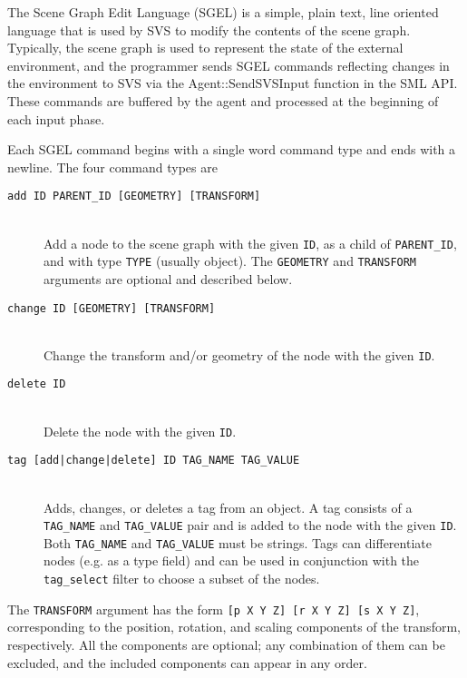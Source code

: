 The Scene Graph Edit Language (SGEL) is a simple, plain text, line oriented language that is used by SVS to modify the contents of the scene graph.
Typically, the scene graph is used to represent the state of the external environment, and the programmer sends SGEL commands reflecting changes in the environment to SVS via the Agent::SendSVSInput function in the SML API.
These commands are buffered by the agent and processed at the beginning of each input phase.

Each SGEL command begins with a single word command type and ends with a newline.
The four command types are

\begin{description}
\item[\texttt{add ID PARENT\_ID [GEOMETRY] [TRANSFORM]}] \hfill \\
Add a node to the scene graph with the given \texttt{ID}, as a child of \texttt{PARENT\_ID}, 
and with type \texttt{TYPE} (usually object).
The \texttt{GEOMETRY} and \texttt{TRANSFORM} arguments are optional and described below.

\item[\texttt{change ID [GEOMETRY] [TRANSFORM]}] \hfill \\
Change the transform and/or geometry of the node with the given \texttt{ID}.

\item[\texttt{delete ID}] \hfill \\
  Delete the node with the given \texttt{ID}.

\item[\texttt{tag [add|change|delete] ID TAG\_NAME TAG\_VALUE}] \hfill \\
  Adds, changes, or deletes a tag from an object.
  A tag consists of a \texttt{TAG\_NAME}  
  and \texttt{TAG\_VALUE} pair and is added to the node with the given \texttt{ID}.
  Both \texttt{TAG\_NAME} and \texttt{TAG\_VALUE} must be strings.
  Tags can differentiate nodes (e.g. as a type field) and can be used in conjunction with 
  the \texttt{tag\_select} filter to choose a subset of the nodes. 

\end{description}

The \texttt{TRANSFORM} argument has the form \texttt{[p X Y Z] [r X Y Z] [s X Y Z]}, corresponding to the position, rotation, and scaling components of the transform, respectively.
All the components are optional; any combination of them can be excluded, and the included components can appear in any order.

